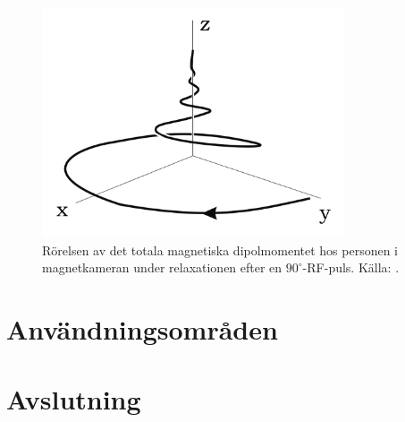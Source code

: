 \documentclass[11pt, a4paper]{article}
\begin{document}
\begin{figure}[ht]
	\centering
	\includegraphics[width=0.8\textwidth]{relaxation}
	\caption{Rörelsen av det totala magnetiska dipolmomentet hos personen i magnetkameran under relaxationen efter en $90^\circ$-RF-puls. Källa: \cite{mri_lärobok}.}
	\label{fig:relaxation}
\end{figure}

\clearpage
\section{Användningsområden}


\clearpage
\section{Avslutning}

\clearpage
\printbibliography
\end{document}
